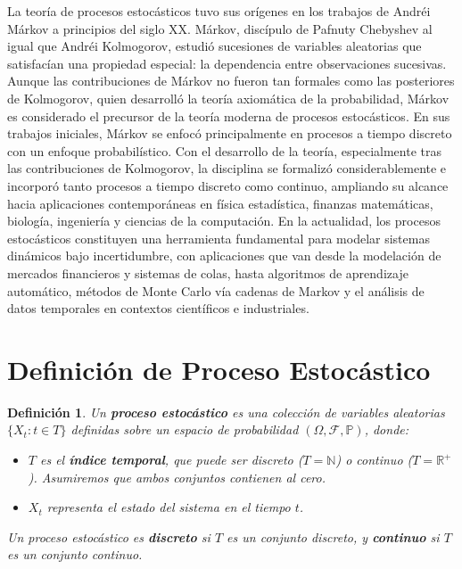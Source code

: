 \documentclass[12pt]{book}
\newtheorem{definition}{Definición}[chapter]
\begin{document}
La teoría de procesos estocásticos tuvo sus orígenes en los trabajos de Andréi Márkov a principios del siglo XX. Márkov, discípulo de Pafnuty Chebyshev al igual que Andréi Kolmogorov, estudió sucesiones de variables aleatorias que satisfacían una propiedad especial: la dependencia entre observaciones sucesivas. Aunque las contribuciones de Márkov no fueron tan formales como las posteriores de Kolmogorov, quien desarrolló la teoría axiomática de la probabilidad, Márkov es considerado el precursor de la teoría moderna de procesos estocásticos. En sus trabajos iniciales, Márkov se enfocó principalmente en procesos a tiempo discreto con un enfoque probabilístico. Con el desarrollo de la teoría, especialmente tras las contribuciones de Kolmogorov, la disciplina se formalizó considerablemente e incorporó tanto procesos a tiempo discreto como continuo, ampliando su alcance hacia aplicaciones contemporáneas en física estadística, finanzas matemáticas, biología, ingeniería y ciencias de la computación. En la actualidad, los procesos estocásticos constituyen una herramienta fundamental para modelar sistemas dinámicos bajo incertidumbre, con aplicaciones que van desde la modelación de mercados financieros y sistemas de colas, hasta algoritmos de aprendizaje automático, métodos de Monte Carlo vía cadenas de Markov y el análisis de datos temporales en contextos científicos e industriales.

\section{Definición de Proceso Estocástico}

\begin{definition} Un \textbf{proceso estocástico} es una colección de variables aleatorias $\{X_t : t \in T\}$ definidas sobre un espacio de probabilidad $(\Omega, \mathcal{F}, \mathbb{P})$, donde:
\begin{itemize}
    \item $T$ es el \textbf{índice temporal}, que puede ser discreto ($T = \mathbb{N}$) o continuo ($T = \mathbb{R}^+$). Asumiremos que ambos conjuntos contienen al cero.
    \item $X_t$ representa el estado del sistema en el tiempo $t$.
\end{itemize}


Un proceso estocástico es \textbf{discreto} si $T$ es un conjunto discreto, y \textbf{continuo} si $T$ es un conjunto continuo.
\end{definition}
\end{document}
